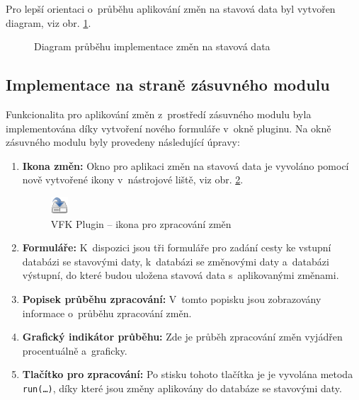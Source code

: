\documentclass[a4paper,12pt,oneside]{book}
\begin{document}
Pro lepší orientaci o~průběhu aplikování změn na stavová data byl vytvořen diagram, viz obr. \ref{l_zmeny_diagram}.

\begin{figure}
  \centering
  
  \caption{Diagram průběhu implementace změn na stavová data}
  \label{l_zmeny_diagram}
\end{figure}


\newpage
\subsection{Implementace na straně zásuvného modulu}
\label{l_implementace_zmen}
Funkcionalita pro aplikování změn z~prostředí zásuvného modulu byla
implementována díky vytvoření nového formuláře v~okně pluginu. Na okně
zásuvného modulu byly provedeny následující úpravy:

\begin{enumerate}
 \item \textbf{Ikona změn:} Okno pro aplikaci změn na stavová data je vyvoláno pomocí nově vytvořené ikony v~nástrojové liště, viz obr. \ref{l_ikona_zmen}.

\begin{figure}[htb]
\centering
\includegraphics[scale=0.9]{images/applyChanges.png}
\caption[VFK Plugin -- ikona pro zpracování změn]{VFK Plugin -- ikona pro zpracování změn}
\label{l_ikona_zmen}
\end{figure} 
 
\item \textbf{Formuláře:} K~dispozici jsou tři formuláře pro zadání
  cesty ke vstupní databázi se stavovými daty, k~databázi se změnovými
  daty a~databázi výstupní, do které budou uložena stavová data
  s~aplikovanými změnami.
 
\item \textbf{Popisek průběhu zpracování:} V~tomto popisku jsou
  zobrazovány informace o~průběhu zpracování změn.
 
\item \textbf{Grafický indikátor průběhu:} Zde je průběh zpracování
  změn vyjádřen procentuálně a~graficky.
 
\item \textbf{Tlačítko pro zpracování:} Po stisku tohoto tlačítka je
  je vyvolána metoda \texttt{run(\dots)}, díky které jsou změny
  aplikovány do databáze se stavovými daty.
 
\end{enumerate}
\end{document}
